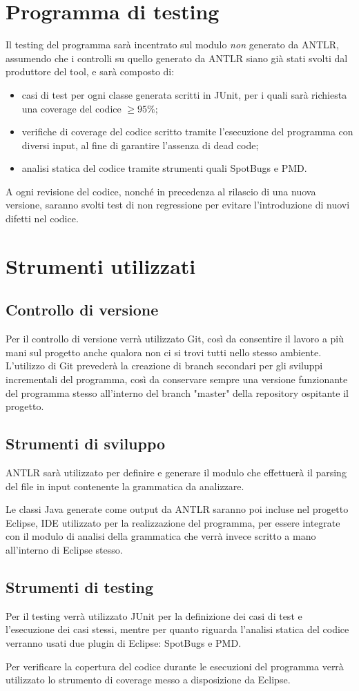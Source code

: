 \documentclass[12pt]{article}
\begin{document}
\section{Programma di testing}
Il testing del programma sarà incentrato sul modulo \textit{non} generato da ANTLR, assumendo che i controlli su quello generato da ANTLR siano già stati svolti dal produttore del tool, e sarà composto di:
\begin{itemize}
\item casi di test per ogni classe generata scritti in JUnit, per i quali sarà richiesta una coverage del codice $\geq 95\%$;
\item verifiche di coverage del codice scritto tramite l'esecuzione del programma con diversi input, al fine di garantire l'assenza di dead code;
\item analisi statica del codice tramite strumenti quali SpotBugs e PMD.
\end{itemize}
A ogni revisione del codice, nonché in precedenza al rilascio di una nuova versione, saranno svolti test di non regressione per evitare l'introduzione di nuovi difetti nel codice.
\pagebreak
\section{Strumenti utilizzati}
\subsection{Controllo di versione}
Per il controllo di versione verrà utilizzato Git, così da consentire il lavoro a più mani sul progetto anche qualora non ci si trovi tutti nello stesso ambiente. L'utilizzo di Git prevederà la creazione di branch secondari per gli sviluppi incrementali del programma, così da conservare sempre una versione funzionante del programma stesso all'interno del branch "master" della repository ospitante il progetto.
\subsection{Strumenti di sviluppo}
ANTLR sarà utilizzato per definire e generare il modulo che effettuerà il parsing del file in input contenente la grammatica da analizzare. \par
Le classi Java generate come output da ANTLR saranno poi incluse nel progetto Eclipse, IDE utilizzato per la realizzazione del programma, per essere integrate con il modulo di analisi della grammatica che verrà invece scritto a mano all'interno di Eclipse stesso.
\subsection{Strumenti di testing}
Per il testing verrà utilizzato JUnit per la definizione dei casi di test e l'esecuzione dei casi stessi, mentre per quanto riguarda l'analisi statica del codice verranno usati due plugin di Eclipse: SpotBugs e PMD. \par
Per verificare la copertura del codice durante le esecuzioni del programma verrà utilizzato lo strumento di coverage messo a disposizione da Eclipse.
\end{document}
